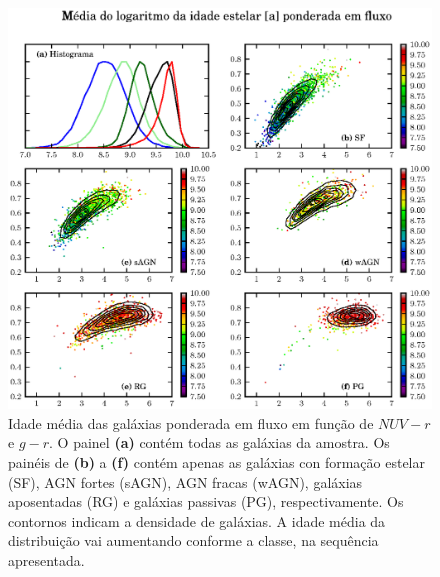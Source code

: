 \begin{figure}
	\includegraphics{figuras/uvcolor-color-at_flux-byclass.eps}
	\caption[Idade média das galáxias ponderada em fluxo no diagrama cor--cor UV.]
	{Idade média das galáxias ponderada em fluxo em função de $NUV-r$ e $g-r$. O
	painel {\bf (a)} contém todas as galáxias da amostra. Os painéis de {\bf (b)}
	a {\bf (f)} contém apenas as galáxias con formação estelar (SF), AGN fortes
	(sAGN), AGN fracas (wAGN), galáxias aposentadas (RG) e galáxias passivas (PG),
	respectivamente. Os contornos indicam a densidade de galáxias. A idade média da
	distribuição vai aumentando conforme a classe, na sequência apresentada.}
	\label{fig:ATFluxColor}
\end{figure}

